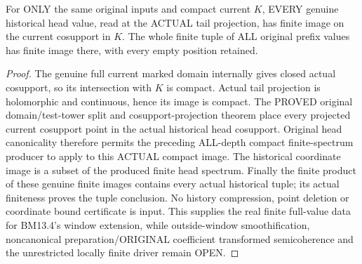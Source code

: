 \begin{theorem}
\label{hir:original-all-depth-actual-historical-full-tuples-compact-finite}
\leanok
For ONLY the same original inputs and compact current $K$, EVERY genuine
historical head value, read at the ACTUAL tail projection, has finite image
on the current cosupport in $K$. The whole finite tuple of ALL original
prefix values has finite image there, with every empty position retained.
\end{theorem}
\begin{proof}
The genuine full current marked domain internally gives closed actual
cosupport, so its intersection with $K$ is compact. Actual tail projection
is holomorphic and continuous, hence its image is compact. The PROVED
original domain/test-tower split and cosupport-projection theorem place
every projected current cosupport point in the actual historical head
cosupport. Original head canonicality therefore permits the preceding
ALL-depth compact finite-spectrum producer to apply to this ACTUAL compact
image. The historical coordinate image is a subset of the produced finite
head spectrum. Finally the finite product of these genuine finite images
contains every actual historical tuple; its actual finiteness proves the
tuple conclusion. No history compression, point deletion or coordinate
bound certificate is input. This supplies the real finite full-value data
for BM13.4's window extension, while outside-window smoothification,
noncanonical preparation/ORIGINAL coefficient transformed semicoherence and
the unrestricted locally finite driver remain OPEN.
\end{proof}

